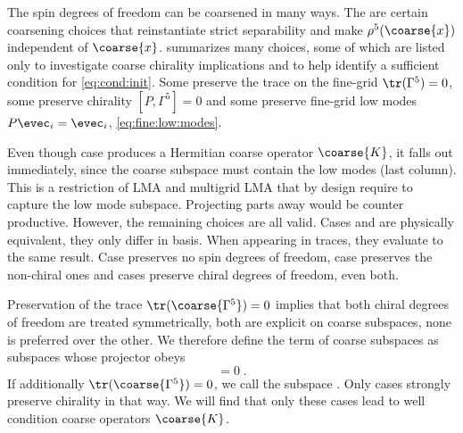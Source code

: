The spin degrees of freedom can be coarsened in many ways.
The are certain coarsening choices that reinstantiate strict separability and make $\rho^5(\coarse{x})$ independent of $\coarse{x}$.
 summarizes many choices, some of which are listed only to investigate coarse chirality implications and to help identify a sufficient condition for \cref{eq:cond:init}.
Some preserve the trace on the fine-grid $\tr(\Gamma^{5})=0$, some preserve chirality $[P, \Gamma^{5}] = 0$ and some preserve fine-grid low modes $P \evec_i = \evec_i$, \cref{eq:fine:low:modes}.

Even though case  produces a Hermitian coarse operator $\coarse{K}$, it falls out immediately, since the coarse subspace must contain the low modes (last column).
This is a restriction of LMA and multigrid LMA that by design require to capture the low mode subspace.
Projecting parts away would be counter productive.
However, the remaining choices are all valid.
Cases  and  are physically equivalent, they only differ in basis.
When appearing in traces, they evaluate to the same result.
Case  preserves no spin degrees of freedom, case  preserves the non-chiral ones and cases  preserve chiral degrees of freedom,  even both.

Preservation of the trace $\tr(\coarse{\Gamma^5})=0$ implies that both chiral degrees of freedom are treated symmetrically, \ie both are explicit on coarse subspaces, none is preferred over the other.
We therefore define the term  of coarse subspaces as subspaces whose projector obeys
\begin{equation}
[P, \Gamma^{5}] = 0 \;.
\end{equation}
If additionally $\tr(\coarse{\Gamma^5}) = 0$, we call the subspace .
Only cases  strongly preserve chirality in that way.
We will find that only these cases lead to well condition coarse operators $\coarse{K}$.

